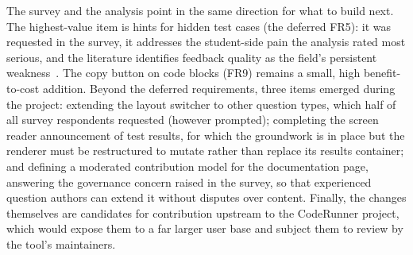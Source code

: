 The survey and the analysis point in the same direction for what to build next. The highest-value item is hints for hidden test cases (the deferred FR5): it was requested in the survey, it addresses the student-side pain the analysis rated most serious, and the literature identifies feedback quality as the field's persistent weakness~\cite{keuningfeedback}. The copy button on code blocks (FR9) remains a small, high benefit-to-cost addition. Beyond the deferred requirements, three items emerged during the project: extending the layout switcher to other question types, which half of all survey respondents requested (however prompted); completing the screen reader announcement of test results, for which the groundwork is in place but the renderer must be restructured to mutate rather than replace its results container; and defining a moderated contribution model for the documentation page, answering the governance concern raised in the survey, so that experienced question authors can extend it without disputes over content. Finally, the changes themselves are candidates for contribution upstream to the CodeRunner project, which would expose them to a far larger user base and subject them to review by the tool's maintainers. 
